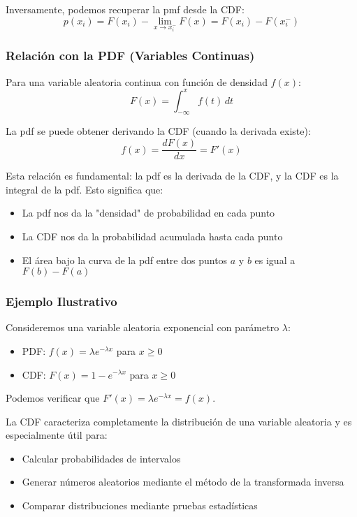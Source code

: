 \documentclass[12pt,a4paper]{article}
\begin{document}
Inversamente, podemos recuperar la pmf desde la CDF:
\begin{equation}
    p(x_i) = F(x_i) - \lim_{x \to x_i^-} F(x) = F(x_i) - F(x_i^-)
\end{equation}

\subsubsection{Relación con la PDF (Variables Continuas)}
Para una variable aleatoria continua con función de densidad $f(x)$:
\begin{equation}
    F(x) = \int_{-\infty}^{x} f(t)\, dt
\end{equation}

La pdf se puede obtener derivando la CDF (cuando la derivada existe):
\begin{equation}
    f(x) = \frac{dF(x)}{dx} = F'(x)
\end{equation}

Esta relación es fundamental: la pdf es la derivada de la CDF, y la CDF es la integral de la pdf. Esto significa que:
\begin{itemize}
    \item La pdf nos da la "densidad" de probabilidad en cada punto
    \item La CDF nos da la probabilidad acumulada hasta cada punto
    \item El área bajo la curva de la pdf entre dos puntos $a$ y $b$ es igual a $F(b) - F(a)$
\end{itemize}

\subsubsection{Ejemplo Ilustrativo}
Consideremos una variable aleatoria exponencial con parámetro $\lambda$:
\begin{itemize}
    \item PDF: $f(x) = \lambda e^{-\lambda x}$ para $x \geq 0$
    \item CDF: $F(x) = 1 - e^{-\lambda x}$ para $x \geq 0$
\end{itemize}
Podemos verificar que $F'(x) = \lambda e^{-\lambda x} = f(x)$.

La CDF caracteriza completamente la distribución de una variable aleatoria y es especialmente útil para:
\begin{itemize}
    \item Calcular probabilidades de intervalos
    \item Generar números aleatorios mediante el método de la transformada inversa
    \item Comparar distribuciones mediante pruebas estadísticas
\end{itemize}
\end{document}
